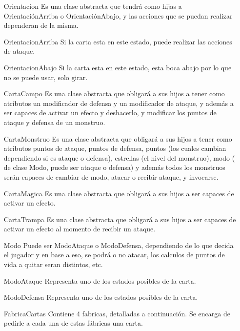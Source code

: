 \begin{itemize}
\item[Orientacion] Es una clase abstracta que tendrá como hijas a OrientaciónArriba o OrientaciónAbajo, y las acciones que se puedan realizar dependeran de la misma.

\item[OrientacionArriba] Si la carta esta en este estado, puede realizar las acciones de ataque. 

\item[OrientacionAbajo] Si la carta esta en este estado, esta boca abajo por lo que no se puede usar, solo girar.

\item[CartaCampo] Es una clase abstracta que obligará a sus hijos a tener como atributos un modificador de defensa y un modificador de ataque, y además a ser capaces de activar un efecto y deshacerlo, y modificar los puntos de ataque y defensa de un monstruo.

\item[CartaMonstruo] Es una clase abstracta que obligará a sus hijos a tener como atributos puntos de ataque, puntos de defensa, puntos (los cuales cambian dependiendo si es ataque o defensa), estrellas (el nivel del monstruo), modo ( de clase Modo, puede ser ataque o defensa) y además todos los monstruos serán capaces de cambiar de modo, atacar o recibir ataque, y invocarse.

\item[CartaMagica] Es una clase abstracta que obligará a sus hijos a ser capaces de activar un efecto.

\item[CartaTrampa] Es una clase abstracta que obligará a sus hijos a ser capaces de activar un efecto al momento de recibir un ataque.

\item[Modo] Puede ser ModoAtaque o ModoDefensa, dependiendo de lo que decida el jugador y en base a eso, se podrá o no atacar, los calculos de puntos de vida a quitar seran distintos, etc.

\item[ModoAtaque] Representa uno de los estados posibles de la carta.

\item[ModoDefensa] Representa uno de los estados posibles de la carta.

\item[FabricaCartas] Contiene 4 fabricas, detalladas a continuación. Se encarga de pedirle a cada una de estas fábricas una carta.


\end{itemize}
